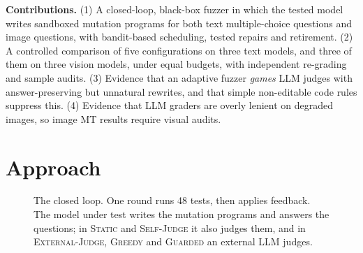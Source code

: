 \documentclass[sigconf]{acmart}
\newcommand{\HW}{\textsc{Static}}
\newcommand{\SJ}{\textsc{Self-Judge}}
\newcommand{\OJ}{\textsc{External-Judge}}
\newcommand{\BOLD}{\textsc{Greedy}}
\newcommand{\BR}{\textsc{Guarded}}
\begin{document}
\textbf{Contributions.}
(1) A closed-loop, black-box fuzzer in which the tested model writes sandboxed mutation programs for both text
multiple-choice questions and image questions, with bandit-based scheduling, tested repairs and retirement.
(2) A controlled comparison of five configurations on three text models, and three of them on three vision models, under equal budgets, with independent re-grading and
sample audits.
(3) Evidence that an adaptive fuzzer \emph{games} LLM judges with answer-preserving but unnatural rewrites, and that
simple non-editable code rules suppress this.
(4) Evidence that LLM graders are overly lenient on degraded images, so image MT results require visual audits.

\section{Approach}

\begin{figure}[t]
\centering
{}
\caption{The closed loop. One round runs 48 tests, then applies feedback. The model under test writes the mutation
programs and answers the questions; in \HW{} and \SJ{} it also judges them, and in \OJ{}, \BOLD{} and \BR{} an
external LLM judges.}
\label{fig:loop}
\end{figure}
\end{document}
